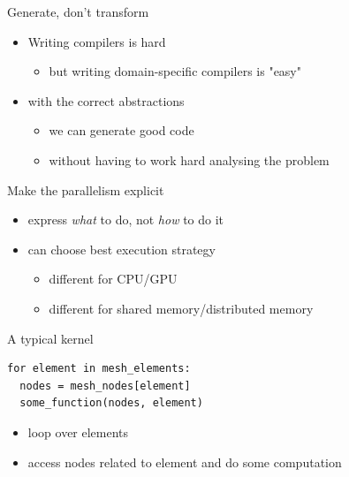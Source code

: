 \documentclass[bigger]{beamer}
\begin{document}
\begin{frame}[label={sec:orgheadline4}]{Generate, don't transform}
\begin{itemize}
\item Writing compilers is hard
\begin{itemize}
\item but writing domain-specific compilers is "easy"
\end{itemize}
\item with the correct abstractions
\begin{itemize}
\item we can generate good code
\item without having to work hard analysing the problem
\end{itemize}
\end{itemize}
\end{frame}

\begin{frame}[label={sec:orgheadline5}]{Make the parallelism explicit}
\begin{itemize}
\item express \emph{what} to do, not \emph{how} to do it
\item can choose best execution strategy
\begin{itemize}
\item different for CPU/GPU
\item different for shared memory/distributed memory
\end{itemize}
\end{itemize}
\end{frame}

\begin{frame}[fragile,label={sec:orgheadline6}]{A typical kernel}
 \begin{verbatim}
for element in mesh_elements:
  nodes = mesh_nodes[element]
  some_function(nodes, element)
\end{verbatim}
\begin{itemize}
\item loop over elements
\item access nodes related to element and do some computation
\end{itemize}
\end{frame}
\end{document}

